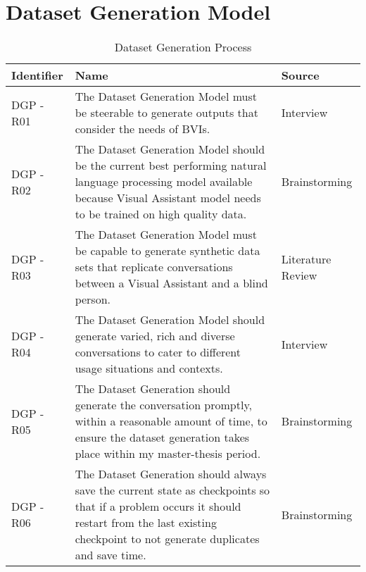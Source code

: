 \section{Dataset Generation Model}
\begin{table}[ht]
  \centering
  \caption{Dataset Generation Process}
\begin{tabularx}{\textwidth}{@{}p{2cm}p{10cm}p{3cm}@{}}
    \toprule
    \textbf{Identifier} & \textbf{Name} & \textbf{Source}\\
    \midrule
    DGP - R01 & The Dataset Generation Model must be steerable to generate outputs that consider the needs of BVIs. & Interview\\
    \hline
    DGP - R02 & The Dataset Generation Model should be the current best performing natural language processing model available because Visual Assistant model needs to be trained on high quality data. & Brainstorming\\
    \hline
    DGP - R03 & The Dataset Generation Model must be capable to generate synthetic data sets that replicate conversations between a Visual Assistant and a blind person.  & Literature Review\\
    \hline
    DGP - R04 &  The Dataset Generation Model should generate varied, rich and diverse conversations to cater to different usage situations and contexts. & Interview\\
    \hline
    DGP - R05 & The Dataset Generation should generate the conversation promptly, within a reasonable amount of time, to ensure the dataset generation takes place within my master-thesis period. & Brainstorming\\
    \hline
    DGP - R06 & The Dataset Generation should always save the current state as checkpoints so that if a problem occurs it should restart from the last existing checkpoint to not generate duplicates and save time. & Brainstorming\\
    \hline
    
    \bottomrule
      \end{tabularx}
  \label{tab:requirements}
\end{table}
